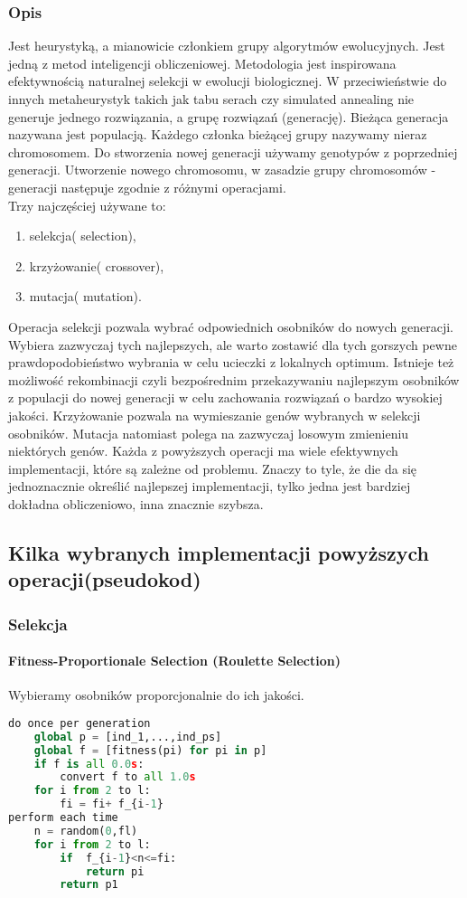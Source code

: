 \documentclass[11pt]{article}
\begin{document}
\subsubsection{Opis}
Jest heurystyką, a mianowicie członkiem grupy algorytmów ewolucyjnych. Jest jedną z metod inteligencji obliczeniowej. Metodologia jest inspirowana efektywnością naturalnej selekcji w ewolucji biologicznej. W przeciwieństwie do innych metaheurystyk takich jak tabu serach czy simulated annealing nie generuje jednego rozwiązania, a grupę rozwiązań (generację). Bieżąca generacja nazywana jest populacją. Każdego członka bieżącej grupy nazywamy nieraz chromosomem. Do stworzenia nowej generacji używamy genotypów z poprzedniej generacji. Utworzenie nowego chromosomu, w zasadzie grupy chromosomów - generacji następuje zgodnie z różnymi operacjami.\\ Trzy najczęściej używane to: \begin{enumerate}
\item selekcja( selection),
\item krzyżowanie( crossover),
\item mutacja( mutation). 
\end{enumerate} 
Operacja selekcji pozwala wybrać odpowiednich osobników do nowych generacji. Wybiera zazwyczaj tych najlepszych, ale warto zostawić dla tych gorszych pewne prawdopodobieństwo wybrania w celu ucieczki z lokalnych optimum. Istnieje też możliwość rekombinacji czyli bezpośrednim przekazywaniu najlepszym osobników z populacji do nowej generacji w celu zachowania rozwiązań o bardzo wysokiej jakości. Krzyżowanie pozwala na wymieszanie genów wybranych w selekcji osobników. Mutacja natomiast polega na zazwyczaj losowym zmienieniu niektórych genów. Każda z powyższych operacji ma wiele efektywnych implementacji, które są zależne od problemu. Znaczy to tyle, że die da się jednoznacznie określić  najlepszej implementacji, tylko jedna jest bardziej dokładna obliczeniowo, inna znacznie szybsza.
\subsection{Kilka wybranych implementacji powyższych operacji(pseudokod)}
\subsubsection{Selekcja}
\paragraph{Fitness-Proportionale Selection (Roulette Selection)}
 Wybieramy osobników proporcjonalnie do ich jakości.
\begin{lstlisting}[language=Python]
do once per generation
	global p = [ind_1,...,ind_ps]
	global f = [fitness(pi) for pi in p]
	if f is all 0.0s:
		convert f to all 1.0s
	for i from 2 to l:
		fi = fi+ f_{i-1}
perform each time
	n = random(0,fl)
	for i from 2 to l:
		if  f_{i-1}<n<=fi:
			return pi
    	return p1
\end{lstlisting}
\end{document}
